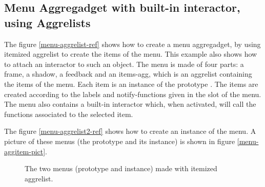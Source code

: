 \subsection{Menu Aggregadget with built-in interactor, using Aggrelists}
\label{Menu-Aggrelist-Example}

The figure \ref{menu-aggrelist-ref} shows how to create a menu aggregadget,
by using itemized aggrelist to create the items of the menu.
This example also shows how to attach an interactor to such an object.
The menu is made of four parts: a frame, a shadow, a feedback
and an items-agg, which is an aggrelist containing the items
of the menu.  Each item is an instance of the prototype .
The items are created according to the labels and notify-functions given in
the  slot of the menu. The menu also contains a built-in interactor which, when
activated, will call the functions associated to the selected item.

The figure \ref{menu-aggrelist2-ref} shows how to create an instance
of the menu. A picture of these menus (the prototype and its instance)
is shown in figure \ref{menu-aggitem-pict}.

\begin{figure}
\begin{center}
\end{center}
\caption{The two menus (prototype and instance) made with itemized aggrelist.}
\end{figure}

